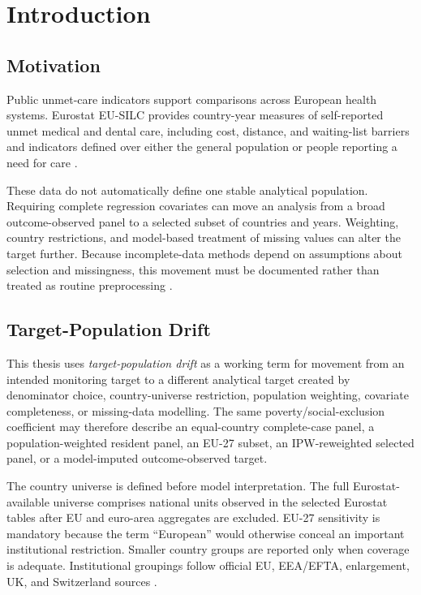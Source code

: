\chapter{Introduction}
\label{ch:introduction}

\section{Motivation}

Public unmet-care indicators support comparisons across European health systems. Eurostat EU-SILC provides country-year measures of self-reported unmet medical and dental care, including cost, distance, and waiting-list barriers and indicators defined over either the general population or people reporting a need for care \citep{eurostat_health_variables_metadata,eurostat_unmet_needs_statistics}.

These data do not automatically define one stable analytical population. Requiring complete regression covariates can move an analysis from a broad outcome-observed panel to a selected subset of countries and years. Weighting, country restrictions, and model-based treatment of missing values can alter the target further. Because incomplete-data methods depend on assumptions about selection and missingness, this movement must be documented rather than treated as routine preprocessing \citep{little_rubin_2019,seaman_white_2013}.

\section{Target-Population Drift}

This thesis uses \emph{target-population drift} as a working term for movement from an intended monitoring target to a different analytical target created by denominator choice, country-universe restriction, population weighting, covariate completeness, or missing-data modelling. The same poverty/social-exclusion coefficient may therefore describe an equal-country complete-case panel, a population-weighted resident panel, an EU-27 subset, an IPW-reweighted selected panel, or a model-imputed outcome-observed target.

The country universe is defined before model interpretation. The full Eurostat-available universe comprises national units observed in the selected Eurostat tables after EU and euro-area aggregates are excluded. EU-27 sensitivity is mandatory because the term ``European'' would otherwise conceal an important institutional restriction. Smaller country groups are reported only when coverage is adequate. Institutional groupings follow official EU, EEA/EFTA, enlargement, UK, and Switzerland sources \citep{eu_countries_2026,europarl_eea_switzerland_2025,european_commission_enlargement_2026,european_commission_uk_relations_2026}.

